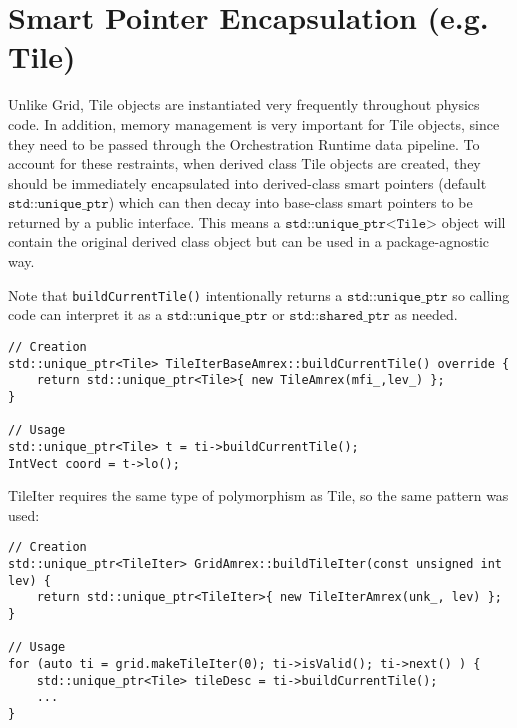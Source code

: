 \documentclass[letterpaper,12pt]{article}
\begin{document}
\section{Smart Pointer Encapsulation (e.g. Tile)}

Unlike Grid, Tile objects are instantiated very frequently throughout physics code. In addition, memory management is very important for Tile objects, since they need to be passed through the Orchestration Runtime data pipeline. To account for these restraints, when derived class Tile objects are created, they should be immediately encapsulated into derived-class smart pointers (default $\texttt{std::unique\_ptr}$) which can then decay into base-class smart pointers to be returned by a public interface. This means a $\texttt{std::unique\_ptr<Tile>}$ object will contain the original derived class object but can be used in a package-agnostic way.

Note that \texttt{buildCurrentTile()}  intentionally returns a $\texttt{std::unique\_ptr}$ so calling code can interpret it as a $\texttt{std::unique\_ptr}$ or $\texttt{std::shared\_ptr}$ as needed.

\begin{verbatim}
// Creation
std::unique_ptr<Tile> TileIterBaseAmrex::buildCurrentTile() override {
    return std::unique_ptr<Tile>{ new TileAmrex(mfi_,lev_) };
}

// Usage
std::unique_ptr<Tile> t = ti->buildCurrentTile();
IntVect coord = t->lo();
\end{verbatim}

TileIter requires the same type of polymorphism as Tile, so the same pattern was used:
\begin{verbatim}
// Creation
std::unique_ptr<TileIter> GridAmrex::buildTileIter(const unsigned int lev) {
    return std::unique_ptr<TileIter>{ new TileIterAmrex(unk_, lev) };
}

// Usage
for (auto ti = grid.makeTileIter(0); ti->isValid(); ti->next() ) {
    std::unique_ptr<Tile> tileDesc = ti->buildCurrentTile();
    ...
}


\end{verbatim}
\end{document}
